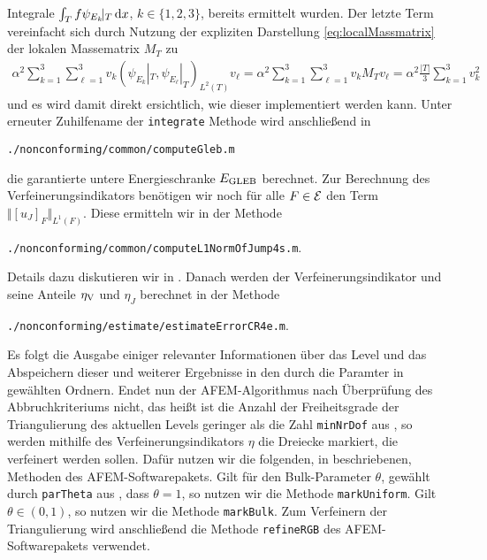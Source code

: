 Integrale $\int_T f\psi_{E_k}\!|_T\,\mathrm{d}x$, $k\in\{1,2,3\}$, bereits ermittelt
wurden.
Der letzte Term vereinfacht sich durch Nutzung der expliziten Darstellung
\eqref{eq:localMassmatrix} der lokalen Massematrix $M_T$ zu
\begin{align*}
  \alpha^2 \sum_{k=1}^3 \sum_{\ell=1}^3 
    v_k \left(\psi_{E_k}\!|_T,\psi_{E_\ell}|_T\right)_{L^2(T)}v_\ell
  =
  \alpha^2 \sum_{k=1}^3 \sum_{\ell=1}^3 
    v_k M_T v_\ell
  =
  \alpha^2\frac{|T|}{3}\sum_{k=1}^3 v_k^2
\end{align*}
und es wird damit direkt ersichtlich, wie dieser implementiert werden kann.
Unter erneuter Zuhilfename der \texttt{integrate} Methode wird anschließend
in
\begin{center}
  \texttt{./nonconforming/common/computeGleb.m}
\end{center}
die garantierte untere Energieschranke $E_\textup{GLEB}$ berechnet. 
Zur Berechnung des Verfeinerungsindikators benötigen wir noch
für alle $F\in\mathcal{E}$ den Term $\Vert[u_J]_F\Vert_{L^1(F)}$. Diese ermitteln wir
in der Methode 
\begin{center}
  \texttt{./nonconforming/common/computeL1NormOfJump4s.m}.
\end{center} 
Details dazu diskutieren wir in .
Danach werden der Verfeinerungsindikator
und seine Anteile $\eta_\textup{V}$ und $\eta_J$ berechnet in der Methode
\begin{center}
  \texttt{./nonconforming/estimate/estimateErrorCR4e.m}.
\end{center}
Es folgt die Ausgabe einiger relevanter Informationen über das Level und das
Abspeichern dieser und weiterer Ergebnisse in den durch die Paramter in
 gewählten Ordnern.
Endet nun der AFEM-Algorithmus nach Überprüfung des Abbruchkriteriums nicht,
das heißt ist die Anzahl der Freiheitsgrade der Triangulierung des aktuellen
Levels geringer als die Zahl \texttt{minNrDof} aus , so
werden mithilfe des Verfeinerungsindikators $\eta$ die Dreiecke markiert, die
verfeinert werden sollen. 
Dafür nutzen wir die folgenden, in \cite[Abschnitt 1.6]{CGKNRR10}
beschriebenen, Methoden des AFEM-Softwarepakets.
Gilt für den Bulk-Parameter $\theta$, gewählt durch \texttt{parTheta} aus
, dass $\theta=1$, so nutzen
wir die Methode \texttt{markUniform}. Gilt $\theta\in(0,1)$, so nutzen wir
die Methode \texttt{markBulk}.
Zum Verfeinern der Triangulierung wird anschließend die Methode
\texttt{refineRGB} \cite[1.7.2]{CGKNRR10} des AFEM-Softwarepakets verwendet.

